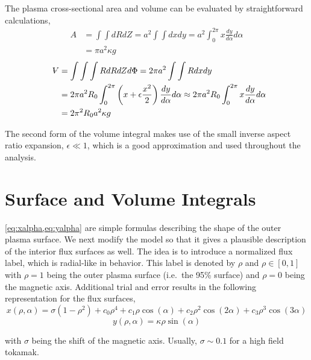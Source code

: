 The plasma cross-sectional area and volume can be evaluated by straightforward calculations,
\begin{equation}
\begin{split}
	A & = \int \int dR dZ = a^2 \int \int dx dy = a^2 \int_0^{2 \pi} x \frac{dy}{d\alpha} d\alpha \\ & = \pi a^2 \kappa g
\end{split}
\end{equation}
\begin{equation}
\begin{split}
	\volume & = \int \int \int R dR dZ d\Phi = 2 \pi a^2 \int \int R dx dy \\ & = 2 \pi a^2 R_0 \int_0^{2 \pi} \left( x + \epsilon \frac{ x^2 }{ 2} \right) \frac{dy}{d\alpha} d\alpha \approx 2 \pi a^2 R_0 \int_0^{2 \pi} x \frac{dy}{d\alpha} d\alpha \\ & = 2 \pi^2 R_0 a^2 \kappa g
\end{split}
\end{equation}

The second form of the volume integral makes use of the small inverse aspect ratio expansion, $\epsilon \ll 1 $, which is a good approximation and used throughout the analysis.

\section{Surface and Volume Integrals}

\cref{eq:xalpha,eq:yalpha} are simple formulas describing the shape of the outer plasma surface. We next modify the model so that it gives a plausible description of the interior flux surfaces as well. The idea is to introduce a normalized flux label, which is radial-like in behavior. This label is denoted by $\rho$ and $\rho \in [0,1]$ with $\rho = 1$ being the outer plasma surface (i.e.\ the 95\% surface) and $\rho = 0$ being the magnetic axis. Additional trial and error results in the following representation for the flux surfaces,
\begin{equation}
	x(\rho,\alpha) = \sigma( 1 - \rho^2 ) + c_0 \rho^4 + c_1 \rho \cos(\alpha) + c_2 \rho^2 \cos(2\alpha) +
		c_3 \rho^3 \cos(3\alpha)
\end{equation}
\begin{equation}
	y(\rho, \alpha) = \kappa \rho \sin(\alpha)
\end{equation}

with $\sigma$ being the shift of the magnetic axis. Usually, $\sigma \sim 0.1$ for a high field tokamak.

